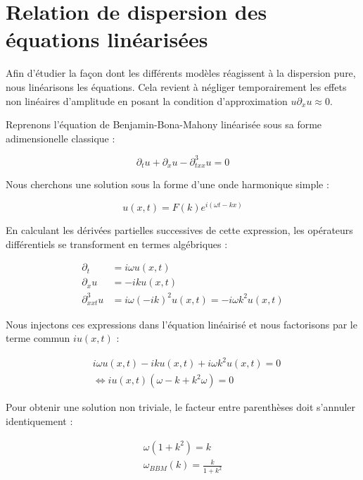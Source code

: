 \section{Relation de dispersion des équations linéarisées}

Afin d'étudier la façon dont les différents modèles réagissent à la dispersion pure, nous linéarisons les équations. Cela revient à négliger temporairement les effets non linéaires d'amplitude en posant la condition d'approximation $u\partial_xu \approx 0$.

Reprenons l'équation de Benjamin-Bona-Mahony linéarisée sous sa forme adimensionelle classique :

\begin{equation}
    \partial_t u + \partial_x u - \partial^3_{txx} u = 0
\end{equation}

Nous cherchons une solution sous la forme d'une onde harmonique simple :

\begin{equation}
    u(x,t) = F(k) e^{i(\omega t - kx)}
\end{equation}

En calculant les dérivées partielles successives de cette expression, les opérateurs différentiels se transforment en termes algébriques :

\begin{align*}
    \partial_t &= i \omega u (x,t)\\
    \partial_x u &= -iku(x,t) \\
    \partial^3_{xxt} u &= i\omega (-ik)^2 u(x,t) = -i \omega k^2 u(x,t) 
\end{align*}

Nous injectons ces expressions dans l'équation linéairisé et nous factorisons par le terme commun $iu(x,t)$ :

\begin{align*}
    &i \omega u(x,t) -iku(x,t) + i \omega k^2 u(x,t) = 0\\
    &\Leftrightarrow i u(x,t) ( \omega - k + k^2 \omega) = 0
\end{align*}

Pour obtenir une solution non triviale, le facteur entre parenthèses doit s'annuler identiquement :

\begin{align*}
    \omega (1 + k^2) = k\\
    \omega_{BBM} (k) = \frac{k}{1 + k^2}
\end{align*}

